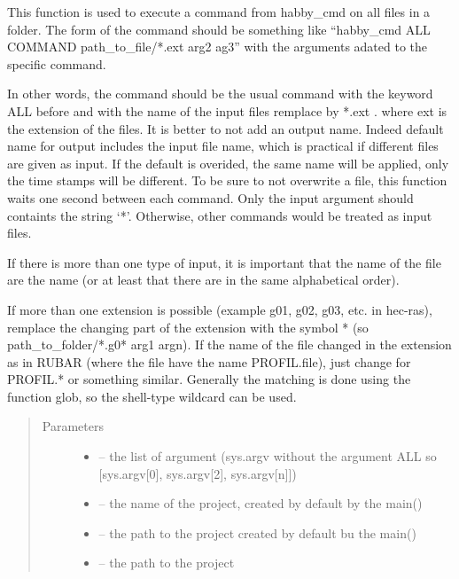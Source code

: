\documentclass[letterpaper,10pt,english]{sphinxmanual}
\begin{document}
\begin{fulllineitems}
\label{\detokenize{index:habby_cmd.habby_on_all}}
This function is used to execute a command from habby\_cmd on all files in a folder. The form of the command should
be something like ``habby\_cmd ALL COMMAND path\_to\_file/*.ext arg2 ag3'' with the arguments adated to the specific
command.

In other words, the command should be the usual command with the keyword ALL before and with the name of
the input files remplace by *.ext . where ext is the extension of the files.
It is better to not add an output name. Indeed default name for output includes the input file name, which
is practical if different files are given as input. If the default
is overided, the same name will be applied, only the time stamps will be different. To be sure to not overwrite a
file, this function waits one second between each command. Only the input argument should containts the string `*'.
Otherwise, other commands would be treated as input files.

If there is more than one type of input, it is important that the name of the file are the name (or at least
that there are in the same alphabetical order).

If more than one extension is possible (example g01, g02, g03, etc. in hec-ras), remplace the changing part of the
extension with the symbol * (so path\_to\_folder/*.g0* arg1 argn). If the name of the file changed in the extension
as in RUBAR (where the file have the name PROFIL.file), just change for PROFIL.* or something similar. Generally
the matching is done using the function glob, so the shell-type wildcard can be used.
\begin{quote}\begin{description}
\item[{Parameters}] \leavevmode\begin{itemize}
\item {} 
 -- the list of argument (sys.argv without the argument ALL so {[}sys.argv{[}0{]}, sys.argv{[}2{]}, sys.argv{[}n{]}{]})

\item {} 
 -- the name of the project, created by default by the main()

\item {} 
 -- the path to the project created by default bu the main()

\item {} 
 -- the path to the project

\end{itemize}

\end{description}\end{quote}

\end{fulllineitems}
\end{document}
